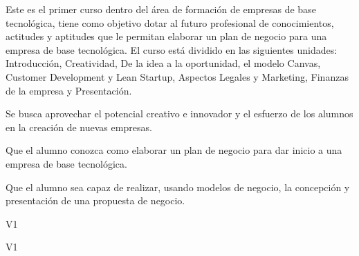 \begin{syllabus}


\begin{justification}
   Este es el primer curso dentro del área de formación de empresas de
   base tecnológica, tiene como objetivo dotar al futuro profesional 
   de conocimientos, actitudes y aptitudes que le
   permitan elaborar un plan de negocio para una empresa de base tecnológica.
   El curso está dividido en las siguientes unidades:
   Introducción, Creatividad, De la idea a la oportunidad, el modelo Canvas, Customer Development y Lean Startup, Aspectos Legales y Marketing, Finanzas de la empresa y Presentación.
   
   Se busca aprovechar el potencial creativo e innovador y el esfuerzo de los alumnos en la creación de nuevas empresas.
   \end{justification}
   
   \begin{goals}
   \item Que el alumno conozca como elaborar un plan de negocio para dar inicio a una empresa de base tecnológica.
   \item Que el alumno sea capaz de realizar, usando modelos de negocio, la concepción y presentación de una propuesta de negocio.
   \end{goals}
   
   \begin{outcomes}{V1}
       \item {}
       \item {}
       \item {}
       \item {}
       \item {}
   \end{outcomes}
   
   \begin{competences}{V1}
       \item {} %
       \item {} %
       \item {}
       \item {}
       \item {}
       \item {}
       \item {}
       \item {}
       

\end{competences}
\end{syllabus}
